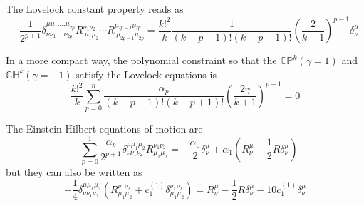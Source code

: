 The Lovelock constant property reads as
\begin{equation*}
    -\frac{1}{2^{p+1}}\delta^{\mu\mu_1....\mu_{2p}}_{\nu\nu_1....\nu_{2p}}R^{\nu_1\nu_2}_{\ \mu_1\mu_2}\cdots R^{\nu_{2p-1}\nu_{2p}}_{\ \mu_{2p-1}\mu_{2p}}=\frac{k!^2}{k}\frac{1}{(k-p-1)!(k-p+1)!}\left(\frac{2}{k+1}\right)^{p-1}\delta^\mu_\nu
\end{equation*}

\begin{tcolorbox}
In a more compact way, the polynomial constraint so that the $\mathbb{CP}^k (\gamma=1)$ and $\mathbb{CH}^k (\gamma=-1)$ satisfy the Lovelock equations is
\begin{equation*}
    \frac{k!^2}{k}\sum_{p=0}^n\frac{\alpha_p}{(k-p-1)!(k-p+1)!}\left(\frac{2\gamma}{k+1}\right)^{p-1}=0
\end{equation*}
\end{tcolorbox}

\newpage
The Einstein-Hilbert equations of motion are
\begin{equation*}
    -\sum_{p=0}^1\frac{\alpha_p}{2^{p+1}}\delta^{\mu\mu_1\mu_2}_{\nu\nu_1\nu_2}R^{\nu_1\nu_2}_{\mu_1\mu_2}=-\frac{\alpha_0}{2}\delta^\mu_\nu+\alpha_1\left(R^\mu_\nu-\frac{1}{2}R\delta^\mu_\nu\right)
\end{equation*}
but they can also be written as
\begin{equation*}
    -\frac{1}{4}\delta^{\mu\mu_1\mu_2}_{\nu\nu_1\nu_2}\left(R^{\nu_1\nu_2}_{\mu_1\mu_2}+c_1^{(1)}\delta^{\nu_1\nu_2}_{\mu_1\mu_2}\right)=R^\mu_\nu-\frac{1}{2}R\delta^\mu_\nu-10c_1^{(1)}\delta^\mu_\nu
\end{equation*}
